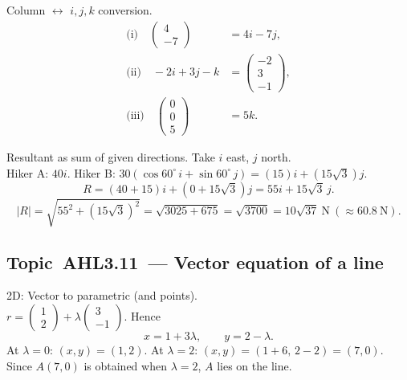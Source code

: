 \documentclass[11pt]{article}
\def\textbf#1{#1}%
\def\mathbf#1{#1}%
\newcommand{\tocsubsection}[1]{\subsection{#1}}
\begin{document}
\begin{solution}
\textbf{Column $\leftrightarrow$ $\mathbf{i},\mathbf{j},\mathbf{k}$ conversion.}
\[
\begin{aligned}
\text{(i)}\quad \begin{pmatrix}4\\-7\end{pmatrix}&=4\mathbf{i}-7\mathbf{j},\\
\text{(ii)}\quad -2\mathbf{i}+3\mathbf{j}-\mathbf{k}&=\begin{pmatrix}-2\\3\\-1\end{pmatrix},\\
\text{(iii)}\quad \begin{pmatrix}0\\0\\5\end{pmatrix}&=5\mathbf{k}.
\end{aligned}
\]
\end{solution}

\begin{solution}
\textbf{Resultant as sum of given directions.}
Take $\mathbf{i}$ east, $\mathbf{j}$ north.\\
Hiker A: $40\mathbf{i}$. \quad
Hiker B: $30(\cos 60^\circ\,\mathbf{i}+\sin 60^\circ\,\mathbf{j})=(15)\mathbf{i}+(15\sqrt{3})\mathbf{j}$.
\[
\mathbf{R}=(40+15)\mathbf{i}+(0+15\sqrt{3})\mathbf{j}=55\mathbf{i}+15\sqrt{3}\,\mathbf{j}.
\]
\[
|\mathbf{R}|=\sqrt{55^{2}+(15\sqrt{3})^{2}}=\sqrt{3025+675}
=\sqrt{3700}=10\sqrt{37}\ \text{N}\ (\approx 60.8\ \text{N}).
\]
\end{solution}





\tocsubsection{Topic AHL3.11 — Vector equation of a line}


\begin{solution}
\textbf{2D: Vector to parametric (and points).}\\
\(\mathbf{r}=\begin{pmatrix}1\\2\end{pmatrix}+\lambda\begin{pmatrix}3\\-1\end{pmatrix}\).
Hence
\[
x=1+3\lambda,\qquad y=2-\lambda.
\]
At \(\lambda=0\): \((x,y)=(1,2)\). \; At \(\lambda=2\): \((x,y)=(1+6,\,2-2)=(7,0)\).  
Since \(A(7,0)\) is obtained when \(\lambda=2\), \(A\) lies on the line.
\end{solution}
\end{document}
